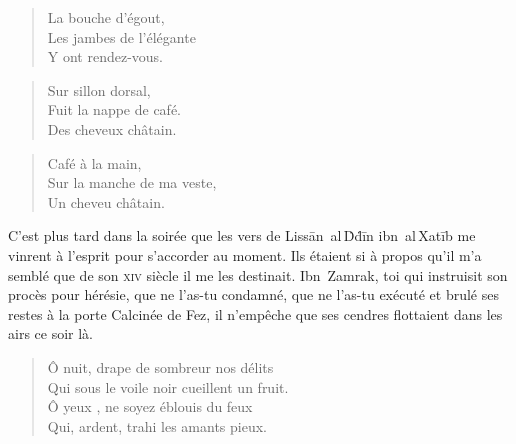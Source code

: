 \begin{verse}\haiku
  La bouche d’égout,\\  %
  Les jambes de l’élégante\\  %
  Y ont rendez-vous.
\end{verse}

\begin{verse}\haiku
  Sur sillon dorsal,\\  %
  Fuit la nappe de café.\\  %
  Des cheveux châtain.
\end{verse}

\begin{verse}\haiku
  Café à la main,\\  %
  Sur la manche de ma veste,\\  %
  Un cheveu châtain.
\end{verse}

\begin{prose}
  C’est plus tard dans la soirée que les vers de Lissān~al\,Ḋḋīn ibn~al\,Xatīb me vinrent à l’esprit pour s’accorder au moment.
  Ils étaient si à propos qu’il m’a semblé que de son \textsc{xiv}\ieme{} siècle il me les destinait.
  Ibn~Zamrak, toi qui instruisit son procès pour hérésie, que ne l’as-tu condamné, que ne l’as-tu exécuté et brulé ses restes  à la porte Calcinée de Fez, il n’empêche que ses cendres flottaient dans les airs ce soir là.
\end{prose}

\begin{verse}\quatrain
  Ô nuit, drape de sombreur nos délits\\ 
  Qui sous le voile noir cueillent un fruit.\\ 
  Ô yeux%
  ,%
  \label{foot.vocaliseYeuxNuit} ne soyez  éblouis du feux\\ 
  Qui, ardent, trahi les amants pieux. %
\end{verse}


